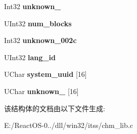 \begin{DoxyCompactItemize}
\mbox{\label{structchm_itsp_header_a4f3460e97b45b09d4723956a9c356008}} 
Int32 {\bfseries unknown\+\_}
\item 
\mbox{\label{structchm_itsp_header_a990d9e093f6c44383eb28c794e4e4792}} 
U\+Int32 {\bfseries num\+\_\+blocks}
\item 
\mbox{\label{structchm_itsp_header_ad626c2f98799bd216cd03ab6d0d3b839}} 
Int32 {\bfseries unknown\+\_\+002c}
\item 
\mbox{\label{structchm_itsp_header_a9e0d6edb7aa296b9cccdcd42386d3d69}} 
U\+Int32 {\bfseries lang\+\_\+id}
\item 
\mbox{\label{structchm_itsp_header_afa64b7ddf88af84ef65d202c4a98d6ea}} 
U\+Char {\bfseries system\+\_\+uuid} \mbox{[}16\mbox{]}
\item 
\mbox{\label{structchm_itsp_header_ab11a1099e1cb4ba08c05fd8f5118cf24}} 
U\+Char {\bfseries unknown\+\_} \mbox{[}16\mbox{]}
\end{DoxyCompactItemize}


该结构体的文档由以下文件生成\+:\begin{DoxyCompactItemize}
\item 
E\+:/\+React\+O\+S-\/0../dll/win32/itss/chm\+\_\+lib.\+c\end{DoxyCompactItemize}
